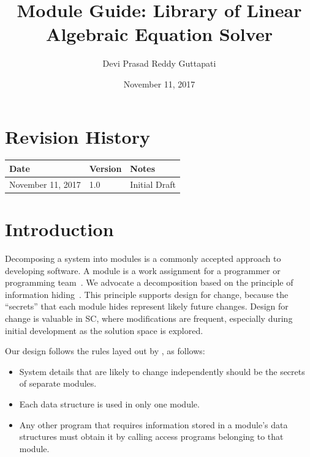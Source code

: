 \documentclass[12pt, titlepage]{article}
\begin{document}
\title{Module Guide: Library of Linear Algebraic Equation Solver} 
\author{Devi Prasad Reddy Guttapati}
\date{November 11, 2017}

\maketitle


\section{Revision History}

\begin{tabularx}{\textwidth}{p{3cm}p{2cm}X}
\toprule {\bf Date} & {\bf Version} & {\bf Notes}\\
\midrule
November 11, 2017 & 1.0 & Initial Draft\\

\bottomrule
\end{tabularx}

\newpage

\tableofcontents

\listoftables

\listoffigures

\newpage



\section{Introduction}

Decomposing a system into modules is a commonly accepted approach to developing
software.  A module is a work assignment for a programmer or programming
team~\citep{ParnasEtAl1984}.  We advocate a decomposition
based on the principle of information hiding~\citep{Parnas1972a}.  This
principle supports design for change, because the ``secrets'' that each module
hides represent likely future changes.  Design for change is valuable in SC,
where modifications are frequent, especially during initial development as the
solution space is explored.  

Our design follows the rules layed out by \citet{ParnasEtAl1984}, as follows:
\begin{itemize}
\item System details that are likely to change independently should be the
  secrets of separate modules.
\item Each data structure is used in only one module.
\item Any other program that requires information stored in a module's data
  structures must obtain it by calling access programs belonging to that module.
\end{itemize}
\end{document}
